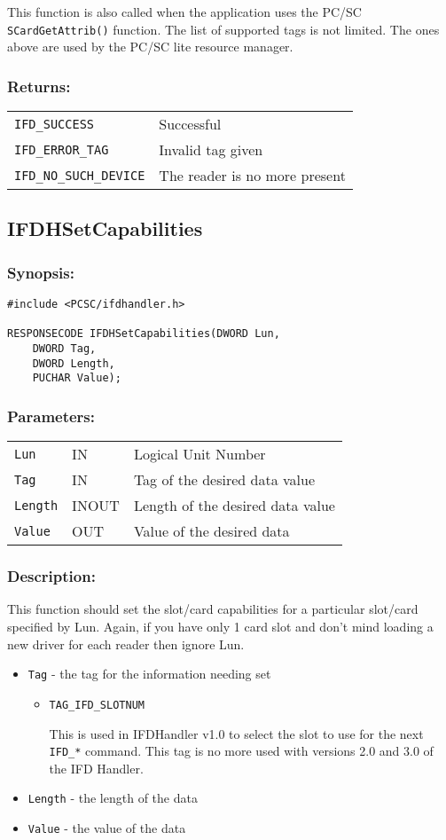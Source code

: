 \documentclass[a4paper,12pt]{article}
\newcommand{\synopsis}{\subsubsection{Synopsis:}}
\newcommand{\parameters}{\subsubsection{Parameters:}}
\newcommand{\desc}{\subsubsection{Description:}}
\newcommand{\returns}{\subsubsection{Returns:}}
\begin{document}
This function is also called when the application uses the PC/SC
\texttt{SCardGetAttrib()} function. The list of supported tags is not
limited.  The ones above are used by the PC/SC lite resource manager.

\returns

\begin{tabular}{ll}
\texttt{IFD\_SUCCESS} & Successful\\
\texttt{IFD\_ERROR\_TAG} & Invalid tag given\\
\texttt{IFD\_NO\_SUCH\_DEVICE} & The reader is no more present\\
\end{tabular}


\subsection{IFDHSetCapabilities}

\synopsis
\begin{verbatim}
#include <PCSC/ifdhandler.h>

RESPONSECODE IFDHSetCapabilities(DWORD Lun,
    DWORD Tag,
    DWORD Length,
    PUCHAR Value);
\end{verbatim}

\parameters

\begin{tabular}{lll}
\texttt{Lun} & IN & Logical Unit Number\\
\texttt{Tag} & IN & Tag of the desired data value\\
\texttt{Length} & INOUT & Length of the desired data value\\
\texttt{Value} & OUT & Value of the desired data\\
\end{tabular}

\desc

This function should set the slot/card capabilities for a particular
slot/card specified by Lun. Again, if you have only 1 card slot and
don't mind loading a new driver for each reader then ignore Lun.

\begin{itemize}
\item \texttt{Tag} - the tag for the information needing set

\begin{itemize}
\item \texttt{TAG\_IFD\_SLOTNUM}

This is used in IFDHandler v1.0 to select the slot to use for the next
\texttt{IFD\_*} command. This tag is no more used with versions 2.0 and
3.0 of the IFD Handler.

\end{itemize}

\item \texttt{Length} - the length of the data
\item \texttt{Value} - the value of the data
\end{itemize}
\end{document}
